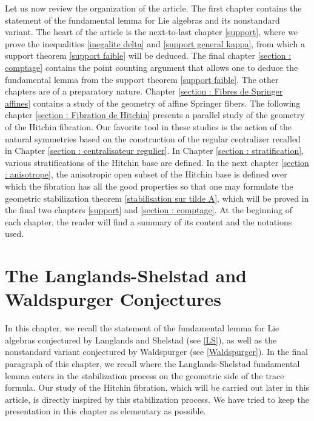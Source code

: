 \documentclass[12pt,english]{smfart}
\numberwithin{equation}{subsection}
\theoremstyle{remark}
\begin{document}
Let us now review the organization of the article. The first chapter contains the statement of the fundamental lemma for Lie algebras and its nonstandard variant. The heart of the article is the next-to-last chapter \ref{support}, where we prove the inequalities \ref{inegalite delta} and \ref{support general kappa}, from which a support theorem \ref{support faible} will be deduced. The final chapter \ref{section : comptage} contains the point counting argument that allows one to deduce the fundamental lemma from the support theorem \ref{support faible}. The other chapters are of a preparatory nature. Chapter \ref{section : Fibres de Springer affines} contains a study of the geometry of affine Springer fibers. The following chapter \ref{section : Fibration de Hitchin} presents a parallel study of the geometry of the Hitchin fibration. Our favorite tool in these studies is the action of the natural symmetries based on the construction of the regular centralizer recalled in Chapter \ref{section : centralisateur regulier}. In Chapter \ref{section : stratification}, various stratifications of the Hitchin base are defined. In the next chapter \ref{section : anisotrope}, the anisotropic open subset of the Hitchin base is defined over which the fibration has all the good properties so that one may formulate the geometric stabilization theorem \ref{stabilisation sur tilde A}, which will be proved in the final two chapters \ref{support} and \ref{section : comptage}. At the beginning of each chapter, the reader will find a summary of its content and the notations used.

\section{The Langlands-Shelstad and Waldspurger Conjectures}

In this chapter, we recall the statement of the fundamental lemma for Lie algebras conjectured by Langlands and Shelstad (see \ref{LS}), as well as the nonstandard variant conjectured by Waldspurger (see \ref{Waldspurger}). In the final paragraph of this chapter, we recall where the Langlands-Shelstad fundamental lemma enters in the stabilization process on the geometric side of the trace formula. Our study of the Hitchin fibration, which will be carried out later in this article, is directly inspired by this stabilization process. We have tried to keep the presentation in this chapter as elementary as possible.
\end{document}
